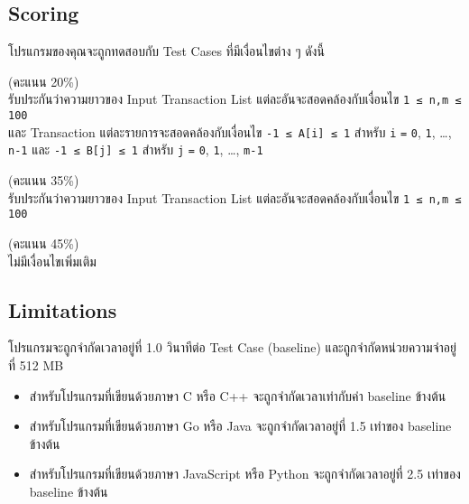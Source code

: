 \subsection{Scoring}

\noindent
โปรแกรมของคุณจะถูกทดสอบกับ Test Cases ที่มีเงื่อนไขต่าง ๆ ดังนี้

\begin{description}[topsep=0pc,itemsep=0pc]
    \item[SMALL] (คะแนน 20\%) \\
        รับประกันว่าความยาวของ Input Transaction List แต่ละอันจะสอดคล้องกับเงื่อนไข \lstinline{1 ≤ n,m ≤ 100} \\ 
        และ Transaction แต่ละรายการจะสอดคล้องกับเงื่อนไข \lstinline{-1 ≤ A[i] ≤ 1} สำหรับ \lstinline{i} \lstinline{=} \lstinline{0}, \lstinline{1}, \ldots, \lstinline{n-1} และ \lstinline{-1 ≤ B[j] ≤ 1} สำหรับ \lstinline{j} \lstinline{=} \lstinline{0}, \lstinline{1}, \ldots, \lstinline{m-1} 
    \item[MEDIUM] (คะแนน 35\%) \\
        รับประกันว่าความยาวของ Input Transaction List แต่ละอันจะสอดคล้องกับเงื่อนไข \lstinline{1 ≤ n,m ≤ 100}
    \item[LARGE] (คะแนน 45\%) \\
        ไม่มีเงื่อนไขเพิ่มเติม
\end{description}


\subsection{Limitations}

\noindent
โปรแกรมจะถูกจำกัดเวลาอยู่ที่ 1.0 วินาทีต่อ Test Case (baseline) และถูกจำกัดหน่วยความจำอยู่ที่ 512 MB
\begin{itemize}[topsep=0pc,itemsep=0pc]
    \item 
        สำหรับโปรแกรมที่เขียนด้วยภาษา C หรือ C++ จะถูกจำกัดเวลาเท่ากับค่า baseline ข้างต้น
    \item 
        สำหรับโปรแกรมที่เขียนด้วยภาษา Go หรือ Java จะถูกจำกัดเวลาอยู่ที่ 1.5 เท่าของ baseline ข้างต้น
    \item 
        สำหรับโปรแกรมที่เขียนด้วยภาษา JavaScript หรือ Python จะถูกจำกัดเวลาอยู่ที่ 2.5 เท่าของ baseline ข้างต้น
\end{itemize}